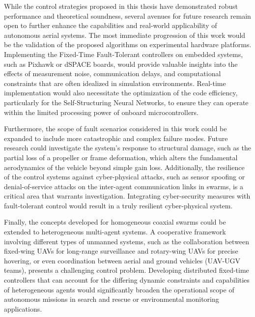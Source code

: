 While the control strategies proposed in this thesis have demonstrated robust performance and theoretical soundness, several avenues for future research remain open to further enhance the capabilities and real-world applicability of autonomous aerial systems. The most immediate progression of this work would be the validation of the proposed algorithms on experimental hardware platforms. Implementing the Fixed-Time Fault-Tolerant controllers on embedded systems, such as Pixhawk or dSPACE boards, would provide valuable insights into the effects of measurement noise, communication delays, and computational constraints that are often idealized in simulation environments. Real-time implementation would also necessitate the optimization of the code efficiency, particularly for the Self-Structuring Neural Networks, to ensure they can operate within the limited processing power of onboard microcontrollers.

Furthermore, the scope of fault scenarios considered in this work could be expanded to include more catastrophic and complex failure modes. Future research could investigate the system's response to structural damage, such as the partial loss of a propeller or frame deformation, which alters the fundamental aerodynamics of the vehicle beyond simple gain loss. Additionally, the resilience of the control systems against cyber-physical attacks, such as sensor spoofing or denial-of-service attacks on the inter-agent communication links in swarms, is a critical area that warrants investigation. Integrating cyber-security measures with fault-tolerant control would result in a truly resilient cyber-physical system.

Finally, the concepts developed for homogeneous coaxial swarms could be extended to heterogeneous multi-agent systems. A cooperative framework involving different types of unmanned systems, such as the collaboration between fixed-wing UAVs for long-range surveillance and rotary-wing UAVs for precise hovering, or even coordination between aerial and ground vehicles (UAV-UGV teams), presents a challenging control problem. Developing distributed fixed-time controllers that can account for the differing dynamic constraints and capabilities of heterogeneous agents would significantly broaden the operational scope of autonomous missions in search and rescue or environmental monitoring applications.